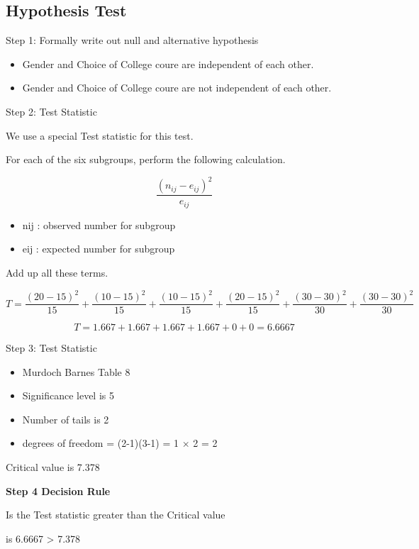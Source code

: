 \documentclass[]{report}
\begin{document}
\subsection{Hypothesis Test}

Step 1:  Formally write out null and alternative hypothesis

\begin{itemize}
	\item Gender and Choice of College coure are independent of each other.
	
	\item Gender and Choice of College coure are not independent of each other.
\end{itemize}

Step 2: Test Statistic

We use a special Test statistic for this test.

For each of the six subgroups, perform the following calculation.

\[\frac{(n_{ij}-e_{ij})^2}{e_{ij}}\]

\begin{itemize}
	\item nij : observed number for subgroup
	\item eij : expected number for subgroup
\end{itemize}


Add up all these terms.

\[T=\frac{(20-15)^2 }{15} + \frac{(10-15)^2 }{15} + \frac{(10-15)^2 }{15} + \frac{(20-15)^2 }{15} + \frac{(30-30)^2 }{30} + \frac{(30-30)^2 }{30}\]

\[
T= 1.667 + 1.667 +1.667 +1.667 +0 +0 = 6.6667 
\]



Step 3: Test Statistic

\begin{itemize}
	\item Murdoch Barnes Table 8
	\item Significance level is 5%
	\item Number of tails is 2
	\item degrees of freedom = (2-1)(3-1) = 1 $\times$ 2 = 2
\end{itemize}



Critical value is 7.378

\textbf{Step 4 Decision Rule}

Is the Test statistic greater than the Critical value

is 6.6667 > 7.378
\end{document}
